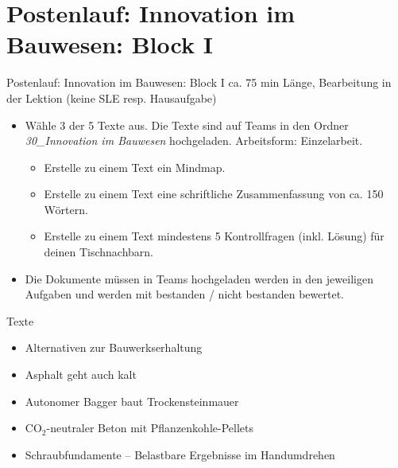 \section{Postenlauf: Innovation im Bauwesen: Block I}
\BlueSectionSlide

\begin{frame}{Postenlauf: Innovation im Bauwesen: Block I}
    ca. 75 min Länge, Bearbeitung in der Lektion (keine SLE resp. Hausaufgabe)
    \begin{itemize}
        \item [\textbullet] Wähle 3 der 5 Texte aus. Die Texte sind auf Teams in den Ordner \textit{30\_Innovation im Bauwesen} hochgeladen. Arbeitsform: Einzelarbeit.
        \begin{itemize}
            \item [\textbullet] Erstelle zu einem Text ein Mindmap. 
            \item [\textbullet] Erstelle zu einem Text eine schriftliche Zusammenfassung von ca. 150 Wörtern.
            \item [\textbullet] Erstelle zu einem Text mindestens 5 Kontrollfragen (inkl. Lösung) für deinen Tischnachbarn.
        \end{itemize}
        \item [\textbullet] Die Dokumente müssen in Teams hochgeladen  werden in den jeweiligen Aufgaben und werden mit bestanden / nicht bestanden bewertet.
    \end{itemize}
    \end{frame}


\begin{frame}{Texte}
    \begin{itemize}
        \item [\textbullet] Alternativen zur Bauwerkserhaltung
        \item [\textbullet] Asphalt geht auch kalt
        \item [\textbullet] Autonomer Bagger baut Trockensteinmauer
        \item [\textbullet] CO$_2$-neutraler Beton mit Pflanzenkohle-Pellets
        \item [\textbullet] Schraubfundamente -- Belastbare Ergebnisse im Handumdrehen
    \end{itemize}

\end{frame}



